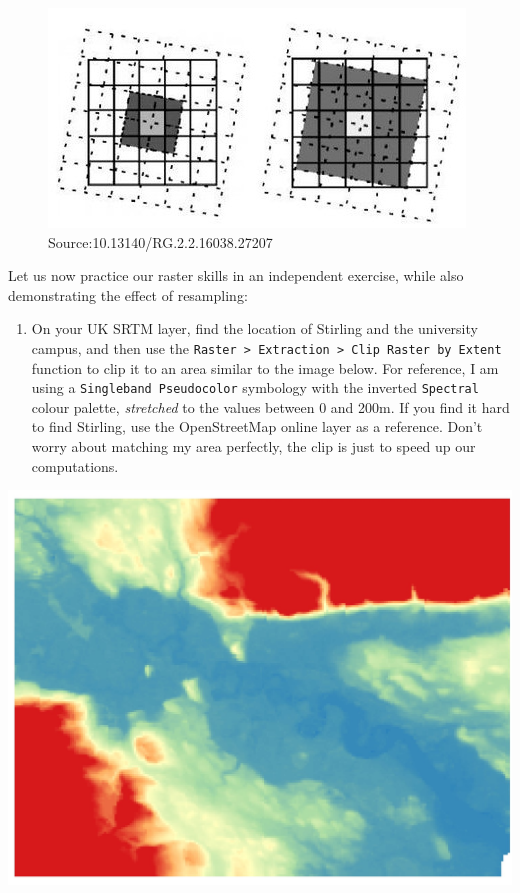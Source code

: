 \documentclass[
  letterpaper,
  DIV=11,
  numbers=noendperiod]{scrreprt}
\providecommand{\tightlist}{%
  \setlength{\itemsep}{0pt}\setlength{\parskip}{0pt}}\usepackage{longtable,booktabs,array}
\begin{document}
\begin{figure}[H]

{\centering \includegraphics{images/lab_6/lab_6_fig13_resamps.jpg}

}

\caption{Source:10.13140/RG.2.2.16038.27207}

\end{figure}%

Let us now practice our raster skills in an independent exercise, while
also demonstrating the effect of resampling:

\begin{enumerate}
\def\labelenumi{\arabic{enumi}.}
\tightlist
\item
  On your UK SRTM layer, find the location of Stirling and the
  university campus, and then use the
  \texttt{Raster\ \textgreater{}\ Extraction\ \textgreater{}\ Clip\ Raster\ by\ Extent}
  function to clip it to an area similar to the image below. For
  reference, I am using a \texttt{Singleband\ Pseudocolor} symbology
  with the inverted \texttt{Spectral} colour palette, \emph{stretched}
  to the values between 0 and 200m. If you find it hard to find
  Stirling, use the OpenStreetMap online layer as a reference. Don't
  worry about matching my area perfectly, the clip is just to speed up
  our computations.
\end{enumerate}

\includegraphics{images/lab_6/lab_6_fig8_StirSRTM.jpg}
\end{document}
